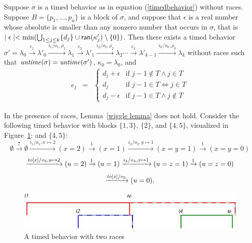 \begin{lemma}
\label{wiggle lemma}
Suppose $\sigma$ is a timed behavior as in equation (\ref{timedbehavior}) without races.
Suppose $B = \{ p_1 ,\ldots, p_u \}$ is a block of $\sigma$, and suppose
that $\epsilon$ is a real number whose absolute is smaller than any nonzero number that occurs in $\sigma$, that is
$\mid \epsilon \mid  < \min (\bigcup_{1 \leq j \leq k} \{ d_j \} \cup {\textsf{ran}}(\kappa'_j) \setminus \{ 0 \} )$.
Then there exists a timed behavior
$\sigma'  =  \lambda_0 \xrightarrow{e_1} \lambda'_0 \xrightarrow{i_1/o_1, \rho_1} \lambda_1 \xrightarrow{e_2} \lambda'_1 \xrightarrow{i_2/o_2, \rho_2} \lambda_2 \cdots
\xrightarrow{e_k} \lambda'_{k-1} \xrightarrow{i_k/o_k, \rho_k} \lambda_{k}$
without races such that
$\mathit{untime}(\sigma)=\mathit{untime}(\sigma')$,
$\kappa_0 = \lambda_0$, and
\begin{eqnarray*}
e_j & = & \left\{ \begin{array}{ll}
d_j + \epsilon & \mbox{if } j-1 \not\in T \wedge j \in T \\
d_j & \mbox{if } j-1 \in T \Leftrightarrow j \in T\\
d_j - \epsilon & \mbox{if } j-1 \in T \wedge j \not\in T
\end{array}\right.
\end{eqnarray*}
\end{lemma}
In the presence of races, Lemma~\ref{wiggle lemma} does not hold. 
Consider the following timed behavior with blocks $\{ 1, 3 \}$, $\{ 2 \}$,
\iflong 
and $\{ 4, 5 \}$, visualized in Figure~\ref{fig:races}:
\else
and $\{ 4, 5 \}$:
\fi
\[
\emptyset \xrightarrow{7} \emptyset \xrightarrow{i_1/o_1, x \mapsto 2} (x=2) \xrightarrow{1} (x=1)
\xrightarrow{i_2/o_2, y \mapsto 1} (x=y=1) \xrightarrow{1} (x=y=0) 
\]
\[
\xrightarrow{\mathit{to}[x]/o_3, u \mapsto 2} (u=2)
\xrightarrow{1} (u=1)
\xrightarrow{i_4/o_4, z \mapsto 1} (u=z=1)
\xrightarrow{1} (u=z=0)
\]
\[
\xrightarrow{\mathit{to}[z]/o_5} (u=0).
\]
\iflong
\begin{figure}
\vspace{-2em}
\begin{center}
\includegraphics[width=.8\textwidth]{wiggling.jpg}
\end{center}
\caption{A timed behavior with two races}
\label{fig:races}
\end{figure}
